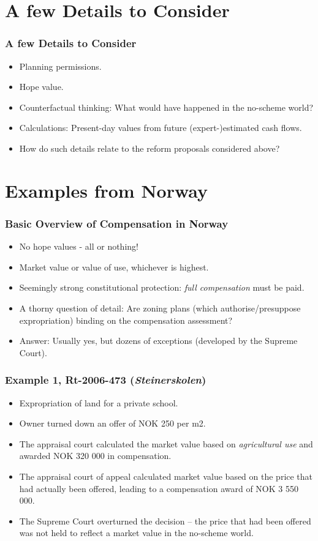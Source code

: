 \documentclass{beamer}
\begin{document}
\section{A few Details to Consider}
\begin{frame}\frametitle{A few Details to Consider}
\begin{itemize}
\item Planning permissions.
\item Hope value.
\item Counterfactual thinking: What would have happened in the no-scheme world?
\item Calculations: Present-day values from future (expert-)estimated cash flows.
\item How do such details relate to the reform proposals considered above?
\end{itemize}
\end{frame}

\section{Examples from Norway}
\begin{frame}\frametitle{Basic Overview of Compensation in Norway}
\begin{itemize}
\item No hope values - all or nothing!
\item Market value or value of use, whichever is highest.
\item Seemingly strong constitutional protection: {\it full compensation} must be paid.
\item A thorny question of detail: Are zoning plans (which authorise/presuppose expropriation) binding on the compensation assessment?
\item Answer: Usually yes, but dozens of exceptions (developed by the Supreme Court).
\end{itemize}
\end{frame}

\begin{frame}\frametitle{Example 1, Rt-2006-473 ({\it Steinerskolen})}
\begin{itemize}
\item Expropriation of land for a private school.
\item Owner turned down an offer of NOK 250 per m2.
\item The appraisal court calculated the market value based on {\it agricultural use} and awarded NOK 320 000 in compensation.
\item The appraisal court of appeal calculated market value based on the price that had actually been offered, leading to a compensation award of NOK 3 550 000.
\item The Supreme Court overturned the decision -- the price that had been offered was not held to reflect a market value in the no-scheme world.
\end{itemize}
\end{frame}
\end{document}
